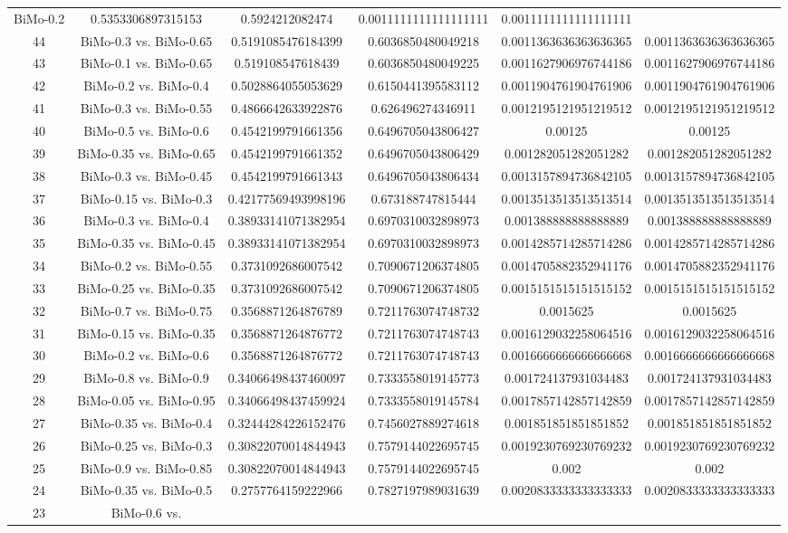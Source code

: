 \documentclass[a4paper,10pt]{article}
\begin{document}
\begin{landscape}
\begin{table}[!htp]
\begin{tabular}{cccccc}
BiMo-0.2&0.5353306897315153&0.5924212082474&0.0011111111111111111&0.0011111111111111111\\44&BiMo-0.3 vs. BiMo-0.65&0.5191085476184399&0.6036850480049218&0.0011363636363636365&0.0011363636363636365\\43&BiMo-0.1 vs. BiMo-0.65&0.519108547618439&0.6036850480049225&0.0011627906976744186&0.0011627906976744186\\42&BiMo-0.2 vs. BiMo-0.4&0.5028864055053629&0.6150441395583112&0.0011904761904761906&0.0011904761904761906\\41&BiMo-0.3 vs. BiMo-0.55&0.4866642633922876&0.626496274346911&0.0012195121951219512&0.0012195121951219512\\40&BiMo-0.5 vs. BiMo-0.6&0.4542199791661356&0.6496705043806427&0.00125&0.00125\\39&BiMo-0.35 vs. BiMo-0.65&0.4542199791661352&0.6496705043806429&0.001282051282051282&0.001282051282051282\\38&BiMo-0.3 vs. BiMo-0.45&0.4542199791661343&0.6496705043806434&0.0013157894736842105&0.0013157894736842105\\37&BiMo-0.15 vs. BiMo-0.3&0.42177569493998196&0.673188747815444&0.0013513513513513514&0.0013513513513513514\\36&BiMo-0.3 vs. BiMo-0.4&0.38933141071382954&0.6970310032898973&0.001388888888888889&0.001388888888888889\\35&BiMo-0.35 vs. BiMo-0.45&0.38933141071382954&0.6970310032898973&0.0014285714285714286&0.0014285714285714286\\34&BiMo-0.2 vs. BiMo-0.55&0.3731092686007542&0.7090671206374805&0.0014705882352941176&0.0014705882352941176\\33&BiMo-0.25 vs. BiMo-0.35&0.3731092686007542&0.7090671206374805&0.0015151515151515152&0.0015151515151515152\\32&BiMo-0.7 vs. BiMo-0.75&0.3568871264876789&0.7211763074748732&0.0015625&0.0015625\\31&BiMo-0.15 vs. BiMo-0.35&0.3568871264876772&0.7211763074748743&0.0016129032258064516&0.0016129032258064516\\30&BiMo-0.2 vs. BiMo-0.6&0.3568871264876772&0.7211763074748743&0.0016666666666666668&0.0016666666666666668\\29&BiMo-0.8 vs. BiMo-0.9&0.34066498437460097&0.7333558019145773&0.001724137931034483&0.001724137931034483\\28&BiMo-0.05 vs. BiMo-0.95&0.34066498437459924&0.7333558019145784&0.0017857142857142859&0.0017857142857142859\\27&BiMo-0.35 vs. BiMo-0.4&0.32444284226152476&0.7456027889274618&0.001851851851851852&0.001851851851851852\\26&BiMo-0.25 vs. BiMo-0.3&0.30822070014844943&0.7579144022695745&0.0019230769230769232&0.0019230769230769232\\25&BiMo-0.9 vs. BiMo-0.85&0.30822070014844943&0.7579144022695745&0.002&0.002\\24&BiMo-0.35 vs. BiMo-0.5&0.2757764159222966&0.7827197989031639&0.0020833333333333333&0.0020833333333333333\\23&BiMo-0.6 vs. 
\end{tabular}
\end{table}
\end{landscape}
\end{document}
